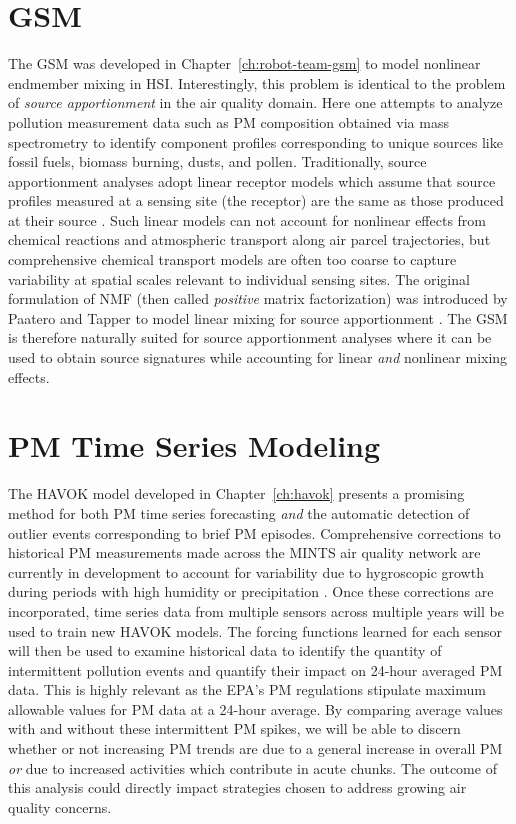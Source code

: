 \section{GSM}

The GSM was developed in Chapter~\ref{ch:robot-team-gsm} to model nonlinear
endmember mixing in HSI. Interestingly, this problem is identical to the problem
of \textit{source apportionment} in the air quality domain. Here one attempts to
analyze pollution measurement data such as PM composition
obtained via mass spectrometry to identify component profiles corresponding to unique
sources like fossil fuels, biomass burning, dusts, and pollen.
Traditionally, source apportionment analyses adopt linear receptor models which
assume that source profiles measured at a sensing site (the receptor) are the
same as those produced at their source \cite{source-apportionment-methods}. Such
linear models can not account for nonlinear effects from chemical reactions and
atmospheric transport along air parcel trajectories, but comprehensive chemical
transport models are often too coarse to capture variability at spatial scales
relevant to individual sensing sites. The original formulation of NMF (then
called \textit{positive} matrix factorization) was introduced by Paatero and
Tapper to model linear mixing for source apportionment \cite{pmf-orig,
  pmf-algs}. The GSM is therefore naturally suited for source apportionment
analyses where it can be used to obtain source signatures while accounting for
linear \textit{and} nonlinear mixing effects.

\section{PM Time Series Modeling}

The HAVOK model developed in Chapter~\ref{ch:havok} presents a promising method
for both PM time series forecasting \textit{and} the automatic detection of
outlier events corresponding to brief PM episodes. Comprehensive corrections to
historical PM measurements made across the MINTS air quality network are
currently in development to account for variability due to hygroscopic growth
during periods with high humidity or precipitation \cite{prabuddha-thesis}. Once
these corrections are incorporated, time series data from multiple sensors
across multiple years will be used to train new HAVOK models. The
forcing functions learned for each sensor will then be used to examine historical data
to identify the quantity of intermittent pollution events and quantify their
impact on 24-hour averaged PM data. This is highly relevant as the EPA's PM
regulations stipulate maximum allowable values for PM data at a 24-hour average.
By comparing average values with and without these intermittent PM spikes, we
will be able to discern whether or not increasing PM trends are due to a general
increase in overall PM \textit{or} due to increased activities which contribute in
acute chunks. The outcome of this analysis could directly impact strategies
chosen to address growing air quality concerns.

